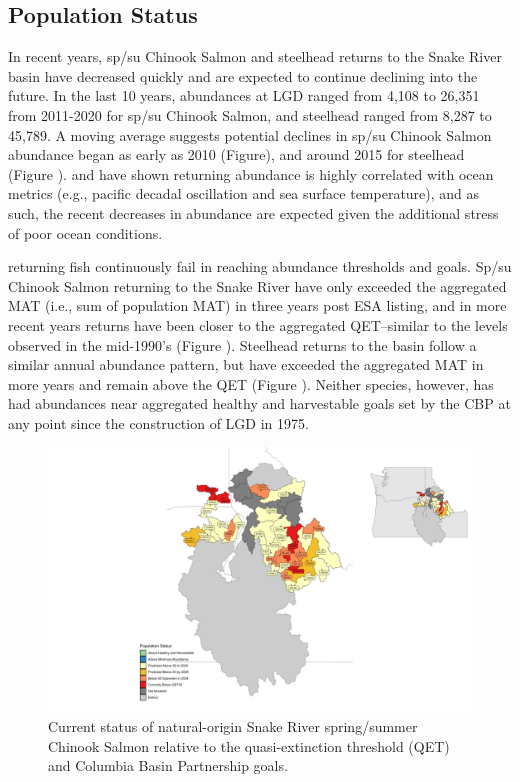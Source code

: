 \documentclass[10pt,a4paper]{article}
\begin{document}
\subsection{Population Status}\label{population-status}

In recent years, sp/su Chinook Salmon and steelhead returns to the Snake River basin have decreased quickly and are expected to continue declining into the future. In the last 10 years, abundances at LGD ranged from 4,108 to 26,351 from 2011-2020 for sp/su Chinook Salmon, and steelhead ranged from 8,287 to 45,789. A moving average suggests potential declines in sp/su Chinook Salmon abundance began as early as 2010 (Figure), and around 2015 for steelhead (Figure ). \textcite{mantua_pacific_1997} and \textcite{crozier_climate_2021} have shown returning abundance is highly correlated with ocean metrics (e.g., pacific decadal oscillation and sea surface temperature), and as such, the recent decreases in abundance are expected given the additional stress of poor ocean conditions.

returning fish continuously fail in reaching abundance thresholds and goals. Sp/su Chinook Salmon returning to the Snake River have only exceeded the aggregated MAT (i.e., sum of population MAT) in three years post ESA listing, and in more recent years returns have been closer to the aggregated QET--similar to the levels observed in the mid-1990's (Figure ). Steelhead returns to the basin follow a similar annual abundance pattern, but have exceeded the aggregated MAT in more years and remain above the QET (Figure ). Neither species, however, has had abundances near aggregated healthy and harvestable goals set by the CBP at any point since the construction of LGD in 1975.

\begin{figure}
\includegraphics[width=1\linewidth]{../figures/Chinook_salmon/Chinook_salmon_map_2024} \caption{Current status of natural-origin Snake River spring/summer Chinook Salmon relative to the quasi-extinction threshold (QET) and Columbia Basin Partnership goals.}\label{fig:chn-qet-map}
\end{figure}
\end{document}

